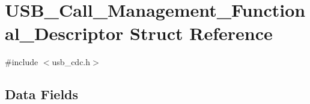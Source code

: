 \hypertarget{struct_u_s_b___call___management___functional___descriptor}{\section{U\-S\-B\-\_\-\-Call\-\_\-\-Management\-\_\-\-Functional\-\_\-\-Descriptor Struct Reference}
\label{struct_u_s_b___call___management___functional___descriptor}
}


{\ttfamily \#include $<$usb\-\_\-cdc.\-h$>$}

\subsection*{Data Fields}
